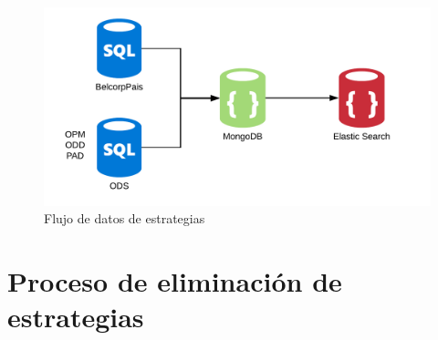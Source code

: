 \documentclass[a4paper,11pt]{paper}
\begin{document}
\begin{figure}[!h]
  \centering
  \includegraphics[width=1.0\textwidth]{imgs/FlujoEstrategias.png}
  \caption{Flujo de datos de estrategias}
  \end{figure}


\newpage
\section{Proceso de eliminación de estrategias}
\end{document}
